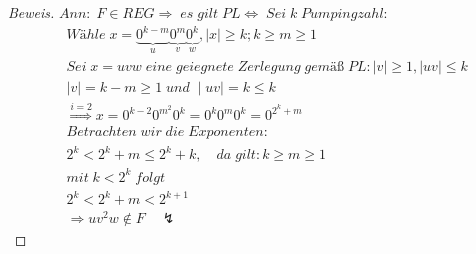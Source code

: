 \begin{proof}[Beweis]
	\begin{math}
		Ann:\;F\in REG\Rightarrow\;es\;gilt\;PL\Leftrightarrow\;Sei\;k\;Pumpingzahl:
	\end{math}
	\begin{align*}
		&Wähle\;x=\underbrace{0^{k-m}}_u\underbrace{0^m}_v\underbrace{0^k}_w,\mid x\mid\ge k;k\ge m\ge1\\\
		&Sei\;x=uvw\;eine\;geiegnete\;Zerlegung\;gemäß\;PL:\mid v\mid\ge1,\mid uv\mid\le k\\
		&\mid v\mid=k-m\ge 1\;und\;\mid uv\mid=k\le k\\
		&\overset{i=2}{\Longrightarrow}x=0^{k-2}0^{m^2}0^k=0^k0^m0^k=0^{2^k+m}\\
		&Betrachten\;wir\;die\;Exponenten:\\
		&2^k<2^k+m\le2^k+k,\quad da\;gilt:k\ge m\ge1\\
		&mit\;k<2^k\;folgt\\
		&2^k<2^k+m<2^{k+1}\\
		&\Rightarrow uv^2w\notin F\quad\lightning
	\end{align*}
\end{proof}